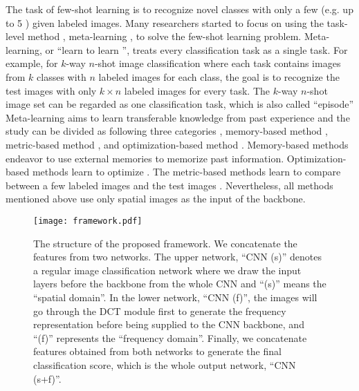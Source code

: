 \documentclass[10pt, conference, compsocconf]{IEEEtran}
\begin{document}
The task of few-shot learning is to recognize novel classes with only a few (e.g. up to 5 \cite{vinyals2016matching}) given labeled images. Many researchers started to focus on using the task-level method \cite{finn2017model,ravi2016optimization,wang2018low,sung2018learning}, meta-learning \cite{thrun2012learning}, to solve the few-shot learning problem. Meta-learning, or \enquote{learn to learn \cite{thrun2012learning}}, treats every classification task as a single task. For example, for $k$-way $n$-shot image classification where each task contains images from $k$ classes with $n$ labeled images for each class, the goal is to recognize the test images with only $k\times n$ labeled images for every task. The $k$-way $n$-shot image set can be regarded as one classification task, which is also called \enquote{episode} \cite{vinyals2016matching} Meta-learning aims to learn transferable knowledge from past experience and the study can be divided as following three categories \cite{finn2017model}, memory-based method \cite{yoo2019coloring,santoro2016meta}, metric-based method \cite{vinyals2016matching,sung2018learning,snell2017prototypical}, and optimization-based method \cite{finn2017model,ravi2016optimization}. Memory-based methods endeavor to use external memories \cite{yoo2019coloring,santoro2016meta} to memorize past information. Optimization-based methods learn to optimize \cite{finn2017model}. The metric-based methods learn to compare between a few labeled images and the test images \cite{vinyals2016matching,sung2018learning,snell2017prototypical}. Nevertheless, all methods mentioned above use only spatial images as the input of the backbone.
\begin{figure*}[tp]
\centering
\texttt{[image: framework.pdf]}\caption{The structure of the proposed framework. We concatenate the features from two networks. The upper network, \enquote{CNN (s)} denotes a regular image classification network where we draw the input layers before the backbone from the whole CNN and \enquote{(s)} means the \enquote{spatial domain}. In the lower network, \enquote{CNN (f)}, the images will go through the DCT module first to generate the frequency representation before being supplied to the CNN backbone, and \enquote{(f)} represents the \enquote{frequency domain}. Finally, we concatenate features obtained from both networks to generate the final classification score, which is the whole output network, \enquote{CNN (s+f)}.}
\label{fig1}
\end{figure*}
\end{document}
